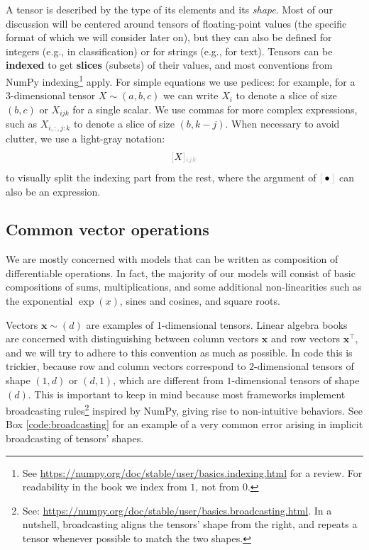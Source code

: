 A tensor is described by the type of its elements and its \textit{shape}. Most of our discussion will be centered around tensors of floating-point values (the specific format of which we will consider later on), but they can also be defined for integers (e.g., in classification) or for strings (e.g., for text). Tensors can be \textbf{indexed} to get \textbf{slices} (subsets) of their values, and most conventions from NumPy indexing\footnote{See \url{https://numpy.org/doc/stable/user/basics.indexing.html} for a review. For readability in the book we index from $1$, not from $0$.} apply. For simple equations we use pedices: for example, for a 3-dimensional tensor $X \sim (a, b, c)$ we can write $X_i$ to denote a slice of size $(b,c)$ or $X_{ijk}$ for a single scalar. We use commas for more complex expressions, such as $X_{i, :, j:k}$ to denote a slice of size $(b, k-j)$. When necessary to avoid clutter, we use a light-gray notation:
%
\begin{equation*}
    \idx{X}{ijk}
\end{equation*}
%
to visually split the indexing part from the rest, where the argument of $\idx{\bullet}{}$ can also be an expression.

\subsection{Common vector operations}
\label{subsec:common_vector_operations}

We are mostly concerned with models that can be written as composition of differentiable operations. In fact, the majority of our models will consist of basic compositions of sums, multiplications, and some additional non-linearities such as the exponential $\exp(x)$, sines and cosines, and square roots.

Vectors $\mathbf{x} \sim (d)$ are examples of 1-dimensional tensors. Linear algebra books are concerned with distinguishing between column vectors $\mathbf{x}$ and row vectors $\mathbf{x}^\top$, and we will try to adhere to this convention as much as possible. In code this is trickier, because row and column vectors correspond to $2$-dimensional tensors of shape $(1,d)$ or $(d,1)$, which are different from $1$-dimensional tensors of shape $(d)$. This is important to keep in mind because most frameworks implement broadcasting rules\footnote{See: \url{https://numpy.org/doc/stable/user/basics.broadcasting.html}. In a nutshell, broadcasting aligns the tensors' shape from the right, and repeats a tensor whenever possible to match the two shapes.} inspired by NumPy, giving rise to non-intuitive behaviors. See Box \ref{code:broadcasting} for an example of a very common error arising in implicit broadcasting of tensors' shapes.

